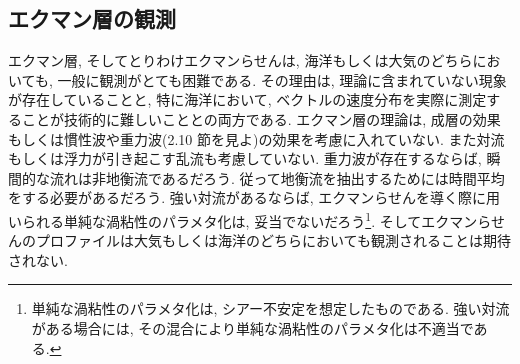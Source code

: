 \documentclass[a4j,12pt,openbib,oneside,dvipdfmx]{jreport}
\begin{document}
\subsection{エクマン層の観測}
エクマン層, そしてとりわけエクマンらせんは, 海洋もしくは大気のどちらにおいても, 一般に観測がとても困難である. その理由は, 理論に含まれていない現象が存在していることと, 特に海洋において, ベクトルの速度分布を実際に測定することが技術的に難しいこととの両方である. エクマン層の理論は, 成層の効果もしくは慣性波や重力波(2.10 節を見よ)の効果を考慮に入れていない. また対流もしくは浮力が引き起こす乱流も考慮していない. 重力波が存在するならば, 瞬間的な流れは非地衡流であるだろう. 従って地衡流を抽出するためには時間平均をする必要があるだろう. 強い対流があるならば, エクマンらせんを導く際に用いられる単純な渦粘性のパラメタ化は, 妥当でないだろう\footnote{単純な渦粘性のパラメタ化は, シアー不安定を想定したものである. 強い対流がある場合には, その混合により単純な渦粘性のパラメタ化は不適当である.}. そしてエクマンらせんのプロファイルは大気もしくは海洋のどちらにおいても観測されることは期待されない.
\end{document}

